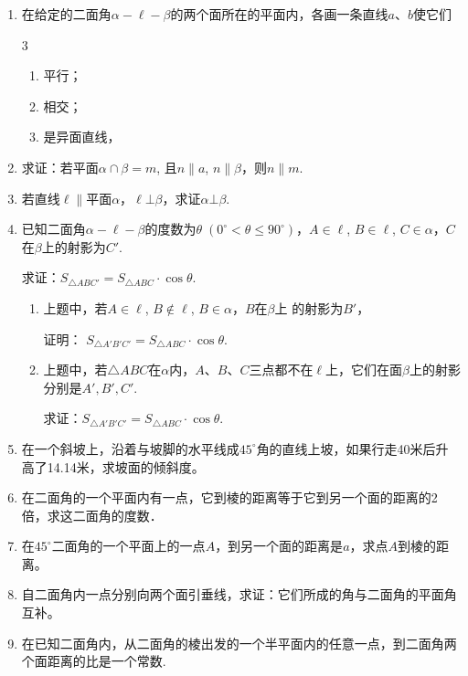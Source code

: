 \begin{enumerate}
\item 在给定的二面角$\alpha-\ell-\beta$的两个面所在的平面内，各画一条直线$a$、$b$使它们
\begin{multicols}{3}
\begin{enumerate}[(1)]
    \item 平行；
    \item 相交；
    \item 是异面直线，
\end{enumerate}
\end{multicols}
\item 求证：若平面$\alpha\cap\beta=m$, 且$n\parallel a$, $n\parallel \beta$，则$n\parallel m$.
\item 若直线$\ell\parallel $平面$\alpha$，$\ell\bot\beta$，求证$\alpha\bot\beta$.
\item 已知二面角$\alpha-\ell-\beta$的度数为$\theta\; (0^{\circ}<\theta\le 90^{\circ})$，$A\in\ell$, $B\in\ell$, $C\in\alpha$，$C$在$\beta$上的射影为$C'$.

求证：$S_{\triangle ABC'}=S_{\triangle ABC}\cdot \cos\theta$.

\begin{enumerate}
    \item 上题中，若$A\in\ell$, $B\notin \ell$, $B\in\alpha$，$B$在$\beta$上
的射影为$B'$，

证明：
$S_{\triangle A'B'C'}=S_{\triangle ABC}\cdot \cos\theta$.
\item 上题中，若$\triangle ABC$在$\alpha$内，$A$、$B$、$C$三点都不在$\ell$上，它们在面$\beta$上的射影分别是$A',B',C'$.

求证：$S_{\triangle A'B'C'}=S_{\triangle ABC}\cdot \cos\theta$.
\end{enumerate}

\item 在一个斜坡上，沿着与坡脚的水平线成$45^{\circ}$角的直线上坡，如果行走40米后升高了14.14米，求坡面的倾斜度。
\item 在二面角的一个平面内有一点，它到棱的距离等于它到另一个面的距离的2倍，求这二面角的度数．
\item 在$45^{\circ}$二面角的一个平面上的一点$A$，到另一个面的距离是$a$，求点$A$到棱的距离。
\item 自二面角内一点分别向两个面引垂线，求证：它们所成的角与二面角的平面角互补。
\item 在已知二面角内，从二面角的棱出发的一个半平面内的任意一点，到二面角两个面距离的比是一个常数.
\end{enumerate}

